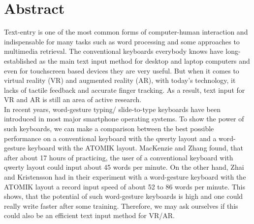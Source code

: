 \chapter{Abstract}
Text-entry is one of the most common forms of computer-human interaction and indispensable for many tasks such as word processing and some approaches to multimedia retrieval. The conventional keyboards everybody knows have long-established as the main text input method for desktop and laptop computers and even for touchscreen based devices they are very useful. But when it comes to virtual reality (VR) and augmented reality (AR), with today's technology, it lacks of tactile feedback and accurate finger tracking. As a result, text input for VR and AR is still an area of active research.\\
In recent years, word-gesture typing/ slide-to-type keyboards have been introduced in most major smartphone operating systems. To show the power of such keyboards, we can make a comparison between the best possible performance on a conventional keyboard with the qwerty layout and a word-gesture keyboard with the ATOMIK layout. MacKenzie and Zhang \cite{10.1145/302979.302983} found, that after about 17 hours of practicing, the user of a conventional keyboard with qwerty layout could input about 45 words per minute. On the other hand, Zhai and Kristensson \cite{Kristensson2004SHARK2AL} had in their experiment with a word-gesture keyboard with the ATOMIK layout a record input speed of about 52 to 86 words per minute. This shows, that the potential of such word-gesture keyboards is high and one could really write faster after some training. Therefore, we may ask ourselves if this could also be an efficient text input method for VR/AR.